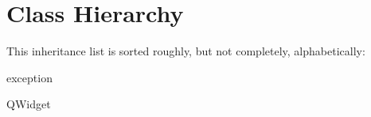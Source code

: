 \section{Class Hierarchy}
This inheritance list is sorted roughly, but not completely, alphabetically\+:\begin{DoxyCompactList}
\item {}
\item exception\begin{DoxyCompactList}
\item {}
\end{DoxyCompactList}
\item {}
\item Q\+Widget\begin{DoxyCompactList}
\item {}
\end{DoxyCompactList}
\end{DoxyCompactList}
